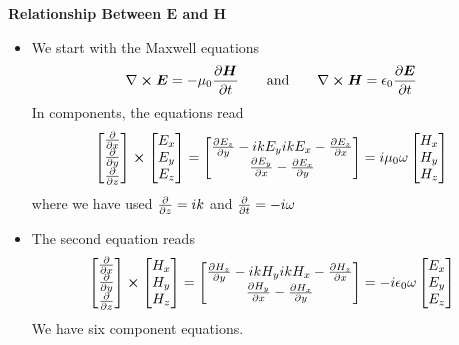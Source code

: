 \documentclass[11pt, a4paper]{article}
\newcommand{\eqtext}[1]{\qquad \text{#1} \qquad}
\renewcommand{\vec}[1]{\bm{#1}} %
\newcommand{\E}{\vec{E}}  %
\renewcommand{\H}{\vec{H}}  %
\newcommand{\ee}{\epsilon_{0}}  %
\newcommand{\mm}{\mu_{0}}  %
\newcommand{\m}{\vec{m}}  %
\renewcommand{\curl}{\nabla \cross}
\begin{document}
\textbf{Relationship Between $ \E $ and $ \H $}
\begin{itemize}
	\item We start with the Maxwell equations
	\begin{equation*}
		\curl \E = - \mm \pdv{\H}{t} \eqtext{and} \curl \H = \ee \pdv{\E}{t}
	\end{equation*}
	In components, the equations read
	\begin{equation*}
		\begin{bmatrix}
		\pdv{x}\\
		\pdv{y}\\
		\pdv{z}
		\end{bmatrix}
		\cross
		\begin{bmatrix}
		E_{x}\\
		E_{y}\\
		E_{z}
		\end{bmatrix}
		= 
		\begin{bmatrix}
		\pdv{E_{z}}{y} - ik E_{y}
		ik E_{x} - \pdv{E_{z}}{x}\\
		\pdv{E_{y}}{x} - \pdv{E_{x}}{y}
		\end{bmatrix} 
		= i \mm \omega
		\begin{bmatrix}
		H_{x}\\
		H_{y}\\
		H_{z}
		\end{bmatrix}
	\end{equation*}
	where we have used $ \pdv{z} = ik $ and $ \pdv{t} = -i\omega $
	
	\item The second equation reads
	\begin{equation*}
		\begin{bmatrix}
		\pdv{x}\\
		\pdv{y}\\
		\pdv{z}
		\end{bmatrix}
		\cross
		\begin{bmatrix}
		H_{x}\\
		H_{y}\\
		H_{z}
		\end{bmatrix}
		= 
		\begin{bmatrix}
		\pdv{H_{z}}{y} - ik H_{y}
		ik H_{x} - \pdv{H_{z}}{x}\\
		\pdv{H_{y}}{x} - \pdv{H_{x}}{y}
		\end{bmatrix} 
		= -i \ee \omega
		\begin{bmatrix}
		E_{x}\\
		E_{y}\\
		E_{z}
		\end{bmatrix}
	\end{equation*}
	We have six component equations. 
	

\end{itemize}
\end{document}
